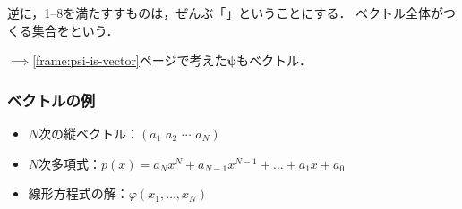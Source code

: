 \documentclass[
    10pt,
    ]{sotsu-beamer}
\begin{document}
\begin{frame}[allowframebreaks]
    \pause

    \alert{逆に，1--8を満たすすものは，ぜんぶ「」ということにする}．
    ベクトル全体がつくる集合をという．
    
    $\implies$\ref{frame:psi-is-vector}ページで考えた$\symbf{\psi}$もベクトル．

\end{frame}


\begin{frame}
    \frametitle{ベクトルの例}

    \begin{itemize}
        \item $N$次の縦ベクトル：$(a_1 \,\, a_2 \,\, \cdots \,\, a_N)$
        \item $N$次多項式：$p(x) = a_N x^N + a_{N-1} x^{N-1} + \dots + a_1 x + a_0$
        \item 線形方程式の解：$\varphi(x_1, \dots, x_N)$
    \end{itemize}

    

\end{frame}
\end{document}
